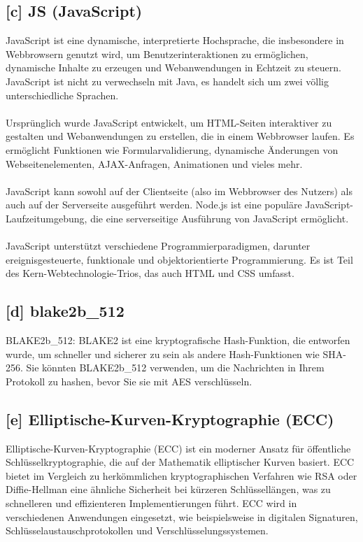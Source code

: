 \subsection*{[c] JS (JavaScript)}
\label{glo:js}
JavaScript ist eine dynamische, interpretierte Hochsprache, die insbesondere in Webbrowsern genutzt wird, um Benutzerinteraktionen zu ermöglichen, dynamische Inhalte zu erzeugen und Webanwendungen in Echtzeit zu steuern. JavaScript ist nicht zu verwechseln mit Java, es handelt sich um zwei völlig unterschiedliche Sprachen.\\\\
Ursprünglich wurde JavaScript entwickelt, um HTML-Seiten interaktiver zu gestalten und Webanwendungen zu erstellen, die in einem Webbrowser laufen. Es ermöglicht Funktionen wie Formularvalidierung, dynamische Änderungen von Webseitenelementen, AJAX-Anfragen, Animationen und vieles mehr.\\\\
JavaScript kann sowohl auf der Clientseite (also im Webbrowser des Nutzers) als auch auf der Serverseite ausgeführt werden. Node.js ist eine populäre JavaScript-Laufzeitumgebung, die eine serverseitige Ausführung von JavaScript ermöglicht.\\\\
JavaScript unterstützt verschiedene Programmierparadigmen, darunter ereignisgesteuerte, funktionale und objektorientierte Programmierung. Es ist Teil des Kern-Webtechnologie-Trios, das auch HTML und CSS umfasst.
\subsection*{[d] blake2b\_512}
\label{glo:blake}
BLAKE2b\_512: BLAKE2 ist eine kryptografische Hash-Funktion, die entworfen wurde, um schneller und sicherer zu sein als andere Hash-Funktionen wie SHA-256. Sie könnten BLAKE2b\_512 verwenden, um die Nachrichten in Ihrem Protokoll zu hashen, bevor Sie sie mit AES verschlüsseln.
\subsection*{[e] Elliptische-Kurven-Kryptographie (ECC)}
\label{glo:ecc}
Elliptische-Kurven-Kryptographie (ECC) ist ein moderner Ansatz für öffentliche \\
Schlüsselkryptographie, die auf der Mathematik elliptischer Kurven basiert.
ECC bietet im Vergleich zu herkömmlichen kryptographischen Verfahren wie RSA oder Diffie-Hellman eine ähnliche Sicherheit bei kürzeren Schlüssellängen, was zu schnelleren und effizienteren Implementierungen führt.
ECC wird in verschiedenen Anwendungen eingesetzt, wie beispielsweise in digitalen Signaturen, Schlüsselaustauschprotokollen und Verschlüsselungssystemen.
